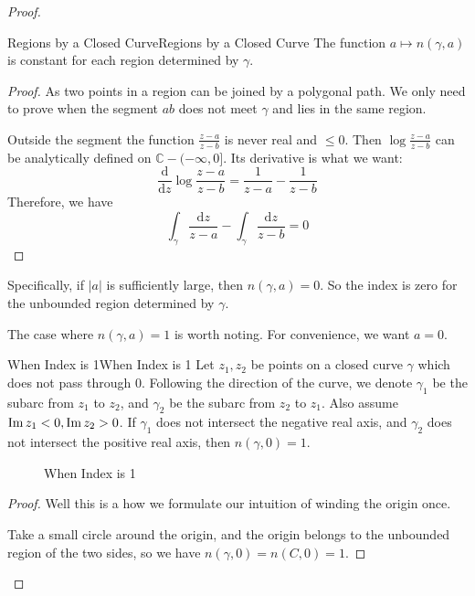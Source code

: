 \documentclass[../main.tex]{subfiles}
\begin{document}
\begin{proof}
\begin{theorem}{Regions by a Closed Curve}{Regions by a Closed Curve}
The function $a \mapsto n(\gamma,a)$ is constant for each region determined by $\gamma$.
\end{theorem}
\begin{proof}
As two points in a region can be joined by a polygonal path. We only need to prove when the segment $ab$ does not meet $\gamma$ and lies in the same region.

Outside the segment the function $\displaystyle \frac{z-a}{z-b}$ is never real and $\leq 0$. Then $\displaystyle \log \frac{z-a}{z-b}$ can be analytically defined on $\mathbb{C}-(-\infty ,0]$. Its derivative is what we want:
\begin{equation*}
	\frac{\mathrm{d}}{\mathrm{d} z} \log \frac{z-a}{z-b} = \frac{1}{z-a} - \frac{1}{z-b}
\end{equation*}
Therefore, we have
\begin{equation*}
	\int_{\gamma} \frac{\mathrm{d} z}{z-a} - \int_{\gamma} \frac{\mathrm{d} z}{z-b} = 0
\end{equation*}
\end{proof}

Specifically, if $\left|a\right|$ is sufficiently large, then $n(\gamma,a) = 0$. So the index is zero for the unbounded region determined by $\gamma$.

The case where $n(\gamma,a)=1$ is worth noting. For convenience, we want $a=0$.

\begin{lemma}{When Index is 1}{When Index is 1}
Let $z_1,z_2$ be points on a closed curve $\gamma$ which does not pass through $0$. Following the direction of the curve, we denote $\gamma_1$ be the subarc from $z_1$ to $z_2$, and $\gamma_2$ be the subarc from $z_2$ to $z_1$. Also assume $\operatorname{Im} z_1 <0,\operatorname{Im} z_2>0$. If $\gamma_1$ does not intersect the negative real axis, and $\gamma_2$ does not intersect the positive real axis, then $n(\gamma,0)=1$.
\end{lemma}

\begin{figure}[ht]
    \centering
    \caption{When Index is 1}
    \label{fig:when-index-is-1}
\end{figure}
\begin{proof}
Well this is a how we formulate our intuition of winding the origin once.

Take a small circle around the origin, and the origin belongs to the unbounded region of the two sides, so we have $n(\gamma,0) = n(C,0)=1$.
\end{proof}


\end{proof}
\end{document}

